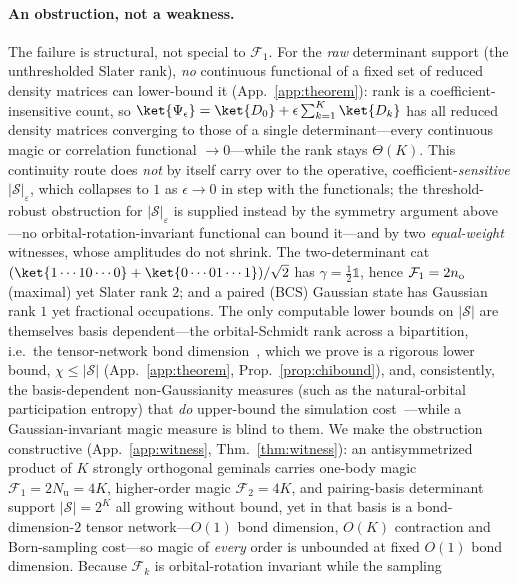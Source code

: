 \paragraph{An obstruction, not a weakness.} The failure is structural, not special to $\mathcal F_1$.
For the \emph{raw} determinant support (the unthresholded Slater rank), \emph{no} continuous functional
of a fixed set of reduced density matrices can lower-bound it (App.~\ref{app:theorem}): rank is a
coefficient-insensitive count, so $\ket{\Psi_\epsilon}=\ket{D_0}+\epsilon\sum_{k=1}^{K}\ket{D_k}$ has all
reduced density matrices converging to those of a single determinant---every continuous magic or
correlation functional $\to0$---while the rank stays $\Theta(K)$. This continuity route does \emph{not}
by itself carry over to the operative, coefficient-\emph{sensitive} $|\mathcal S|_\varepsilon$, which
collapses to $1$ as $\epsilon\to0$ in step with the functionals; the threshold-robust obstruction for
$|\mathcal S|_\varepsilon$ is supplied instead by the symmetry argument above---no
orbital-rotation-invariant functional can bound it---and by two \emph{equal-weight} witnesses, whose
amplitudes do not shrink. The two-determinant cat $(\ket{1\cdots10\cdots0}+\ket{0\cdots01\cdots1})/\sqrt2$
has $\gamma=\tfrac12\mathbb 1$, hence $\mathcal F_1=2n_{\rm o}$ (maximal) yet Slater rank $2$; and a paired (BCS)
Gaussian state has Gaussian rank $1$ yet fractional occupations. The only computable lower bounds on $|\mathcal S|$ are themselves
basis dependent---the orbital-Schmidt rank across a bipartition, i.e.\ the tensor-network bond
dimension~\cite{schollwock2011}, which we prove is a rigorous lower bound, $\chi\le|\mathcal S|$
(App.~\ref{app:theorem}, Prop.~\ref{prop:chibound}), and, consistently, the basis-dependent non-Gaussianity measures
(such as the natural-orbital participation entropy) that \emph{do} upper-bound the simulation
cost~\cite{tarabunga2026}---while a Gaussian-invariant magic measure is blind to them. We make the
obstruction constructive (App.~\ref{app:witness}, Thm.~\ref{thm:witness}): an antisymmetrized product of
$K$ strongly orthogonal geminals carries one-body magic $\mathcal F_1=2N_{\mathrm u}=4K$, higher-order
magic $\mathcal F_2=4K$, and pairing-basis determinant support $|\mathcal S|=2^{K}$ all growing without
bound, yet in that basis is a bond-dimension-$2$ tensor network---$O(1)$ bond dimension, $O(K)$
contraction and Born-sampling cost---so magic of \emph{every} order is unbounded at fixed $O(1)$ bond dimension. Because $\mathcal F_k$ is orbital-rotation invariant while the sampling

